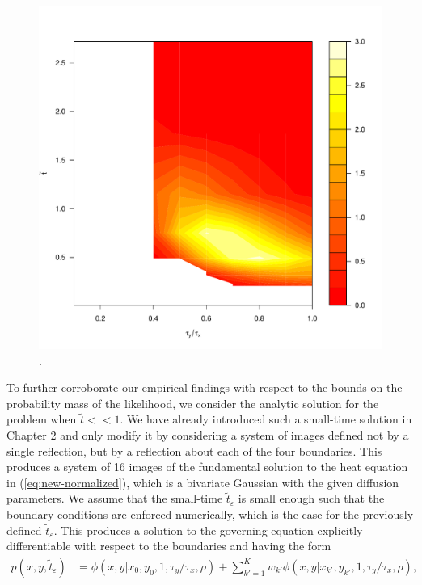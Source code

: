 \documentclass[10pt]{article}
\begin{document}
\begin{enumerate}
\begin{figure}
  \centering
  \includegraphics[scale=0.3]{small-sigma-Galerkin-no-filter-rho-09.pdf}
  \caption{.}
  \label{fig:rho-09}
\end{figure}
To further corroborate our empirical findings with respect to the
bounds on the probability mass of the likelihood, we consider the
analytic solution for the problem when $\tilde{t} << 1$. We have
already introduced such a small-time solution in Chapter 2
and only modify it by considering a system of images defined not by a
single reflection, but by a reflection about each of the four
boundaries. This produces a system of 16 images of the fundamental
solution to the heat equation in (\ref{eq:new-normalized}), which is a
bivariate Gaussian with the given diffusion parameters.  We assume
that the small-time $\tilde{t}_{\varepsilon}$ is small enough such
that the boundary conditions are enforced numerically, which is the
case for the previously defined $\tilde{t}_\varepsilon$. This produces
a solution to the governing equation explicitly differentiable with
respect to the boundaries and having the form
  \begin{align}
    p(x,y,\tilde{t}_\varepsilon) &= \phi(x,y | x_0, y_0, 1, \tau_y/\tau_x, \rho) + \sum_{k' =1}^K
                                   w_{k'} \phi(x,y | x_{k'}, y_{k'}, 1, \tau_y/\tau_x, \rho),

\end{align}
\end{enumerate}
\end{document}
